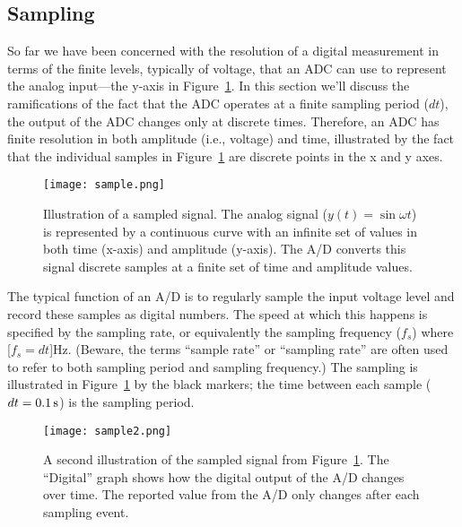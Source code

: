 \subsection{Sampling}
So far we have been concerned with the resolution of a digital measurement in terms of the finite levels, typically of voltage, that an ADC can use to represent the analog input---the y-axis in Figure~\ref{f:sample}.  In this section we'll discuss the ramifications of the fact that the ADC operates at a finite \gls{sampling period} ($dt$), the output of the ADC changes only at discrete times.  Therefore, an ADC has finite resolution in both amplitude (i.e., voltage) and time, illustrated by the fact that the individual samples in Figure~\ref{f:sample} are discrete points in the x and y axes.
\begin{figure}[hbt!]
\centering
\texttt{[image: sample.png]}
\caption{Illustration of a sampled signal.  The analog signal ($y(t)=\sin{\omega t}$) is represented by a continuous curve with an infinite set of values in both time (x-axis) and amplitude (y-axis).  The A/D converts this signal discrete samples at a finite set of time and amplitude values.}
\label{f:sample}
\end{figure}

The typical function of an A/D is to regularly sample the input voltage level and record these samples as digital numbers.  The speed at which this happens is specified by the sampling rate, or equivalently the \gls{sampling frequency} ($f_s$) where \unit[$f_s=dt$]{Hz}. (Beware, the terms ``sample rate'' or ``sampling rate'' are often used to refer to both sampling period and sampling frequency.)  The sampling is illustrated in Figure~\ref{f:sample} by the black markers; the time between each sample ($dt=\unit[0.1]{s}$) is the sampling period.


\begin{figure}[hbt!]
\centering
\texttt{[image: sample2.png]}
\caption{A second illustration of the sampled signal from Figure~\ref{f:sample}. The ``Digital'' graph shows how the digital output of the A/D changes over time.  The reported value from the A/D only changes after each sampling event.}
\label{f:sample2}
\end{figure}

